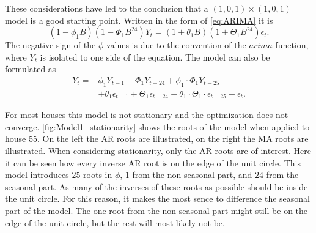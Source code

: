 \noindent These considerations have led to the conclusion that a $(1,0,1)\times (1,0,1)$ model is a good starting point. Written in the form of \cref{eq:ARIMA} it is
\begin{equation}
    (1-\phi_1 B)(1-\Phi_1 B^{24})Y_t = (1+\theta_1 B)(1+\Theta_1 B^{24}) \epsilon_t. \label{eq:model1}
\end{equation}
The negative sign of the $\phi$ values is due to the convention of the $arima$ function, where $Y_t$ is isolated to one side of the equation. The model can also be formulated as
\begin{align}
    Y_t = &\phi_1 Y_{t-1} + \Phi_1 Y_{t-24} + \phi_1 \cdot \Phi_1  Y_{t-25}\\  &+ \theta_1 \epsilon_{t-1} + \Theta_1 \epsilon_{t-24} + \theta_1 \cdot \Theta_1 \cdot \epsilon_{t-25} + \epsilon_t. \nonumber
\end{align}

For most houses this model is not stationary and the optimization does not converge. \cref{fig:Model1_stationarity} shows the roots of the model when applied to house 55. On the left the AR roots are illustrated, on the right the MA roots are illustrated. When considering stationarity, only the AR roots are of interest. Here it can be seen how every inverse AR root is on the edge of the unit circle. This model introduces $25$ roots in $\phi$, $1$ from the non-seasonal part, and $24$ from the seasonal part. As many of the inverses of these roots as possible should be inside the unit circle. For this reason, it makes the most sence to difference the seasonal part of the model. The one root from the non-seasonal part might still be on the edge of the unit circle, but the rest will most likely not be.

